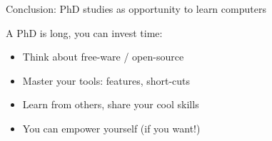 \documentclass[10pt]{beamer}%
\begin{document}
\begin{frame}{Conclusion: PhD studies as opportunity to learn computers}
    \begin{alertblock}{A PhD is long, you can invest time:}
        \begin{itemize}[<+->]
         \item Think about free-ware / open-source
         \item Master your tools: features, short-cuts
         \item Learn from others, share your cool skills
         \item You can empower yourself (if you want!)
        \end{itemize}
    \end{alertblock}
\end{frame}
\end{document}
